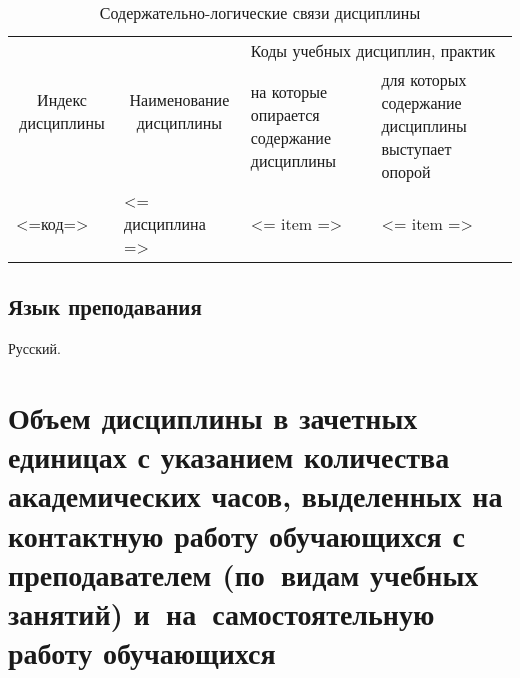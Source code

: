 \documentclass[a4paper,12pt]{article}
\begin{document}
  \begin{table}[H]
  \setlength\arraycolsep{3pt}
  \caption{Содержательно-логические связи дисциплины}
  \begin{tabular}{|l|p{18ex}|*{2}{p{23ex}|}}
  \hline
  \multicolumn{1}{|c|}{\multirow{2}{13ex}{\centering Индекс \linebreak дисциплины}} &
  \multicolumn{1}{c|}{\multirow{2}{18ex}{\centering Наименование \linebreak дисциплины}} & 
  \multicolumn{2}{p{46ex}|}{\centering Коды учебных дисциплин, практик} \\
  \cline{3-4}
   & & 
  \centering на которые опирается содержание дисциплины & 
  \centering\arraybackslash для которых содержание дисциплины выступает опорой
  \\ \hline
  <=код=> & <= дисциплина => 
  & 
  <= item =>%
  & 
  <= item =>%
  \\ \hline
  \end{tabular}
  \end{table}


\subsection{Язык преподавания} 
  Русский.
  



\newpage

\section{Объем дисциплины в зачетных единицах с указанием количества академических часов, выделенных на контактную работу обучающихся с преподавателем (по~видам учебных занятий) и~на~самостоятельную работу обучающихся}
\end{document}
